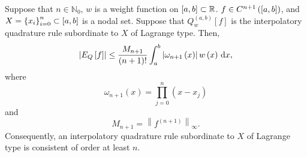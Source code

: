 \begin{frame}
    \begin{theorem}
        Suppose that $n\in\mathbb{N}_{0}$, $w$ is a weight function
        on
        \begin{math}
            \left[a,b\right]\subset
            \mathbb{R}
        \end{math}.
        \begin{math}
            f\in C^{n+1}
            \left(
            \left[a,b\right]
            \right)
        \end{math},
        and
        \begin{math}
            X=
            \left\{x_{i}\right\}_{i=0}^{n}\subset
            \left[a,b\right]
        \end{math}
        is a nodal set.
        Suppose that
        \begin{math}
            Q^{\left(a,b\right)}_{w}
            \left[f\right]
        \end{math}
        is the interpolatory quadrature rule subordinate to $X$ of Lagrange type.
        Then,
        \begin{equation*}
            \left|
            E_{Q}
            \left[f\right]
            \right|\leq
            \dfrac{M_{n+1}}{\left(n+1\right)!}
            \int_{a}^{b}
            \left|
            \omega_{n+1}
            \left(x\right)
            \right|
            w\left(x\right)
            \dl x,
        \end{equation*}
        where
        \begin{equation*}
            \omega_{n+1}
            \left(x\right)=
            \prod\limits_{j=0}^{n}
            \left(x-x_{j}\right)
        \end{equation*}
        and
        \begin{equation*}
            M_{n+1}=
            {\left\|
            f^{\left(n+1\right)}
            \right\|}_{\infty}.
        \end{equation*}
        Consequently, an interpolatory quadrature rule subordinate to
        $X$ of Lagrange type is consistent of order at least $n$.
    \end{theorem}

\end{frame}
